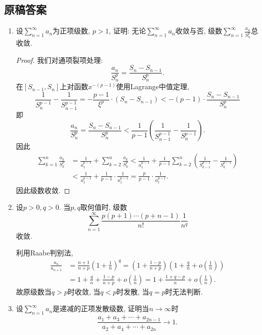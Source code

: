 \documentclass[UTF8,11pt, a4paper, oneside, fontset=none]{ctexbook}
\begin{document}
\subsection*{原稿答案}

\begin{enumerate}


\item 设$\sum_{n=1}^{\infty} a_n$为正项级数, $p>1$, 证明: 无论$\sum_{n=1}^{\infty} a_n$收敛与否, 级数$\sum_{n=1}^{\infty} \frac{a_n}{S_n^p}$总收敛.


\begin{proof}

我们对通项裂项处理:
\[
\frac{a_n}{S_n^p} = \frac{S_n - S_{n-1}}{S_n^p}.
\]
在$[S_{n-1}, S_n]$上对函数$x^{-(p-1)}$使用Lagrange中值定理, 
\[
\frac{1}{S_{n}^{p-1}} - \frac{1}{S_{n-1}^{p-1}} = - \frac{p-1}{\xi^p} \cdot (S_n-S_{n-1}) <- ( p - 1) \cdot \frac{S_n-S_{n-1}}{S_n^p}
\]
即
\[
\frac{a_n}{S_n^p} = \frac{S_n - S_{n-1}}{S_n^p} < \frac{1}{p-1} \left( \frac{1}{S_{n-1}^{p-1}} - \frac{1}{S_n^{p-1}} \right).
\]
因此
\begin{align*}
\sum_{k=1}^{n} \frac{a_k}{S_k^p} &= \frac{1}{a_1^{p-1}} + \sum_{k=2}^{n} \frac{a_k}{S_k^p} < \frac{1}{a_1^{p-1}} + \frac{1}{p-1} \sum_{k=2}^{n} \left( \frac{1}{S_{k-1}^{p-1}} - \frac{1}{S_k^{p-1}} \right)\\
&< \frac{1}{a_1^{p-1}} + \frac{1}{p-1} \cdot \frac{1}{a_1^{p-1}} = \frac{p}{p-1} \cdot \frac{1}{a_1^{p-1}}.
\end{align*}
因此级数收敛.

\end{proof}


\item 设$p>0, q>0$. 当$p, q$取何值时, 级数
\[
\sum_{n=1}^{\infty} \frac{p(p+1)\cdots (p+n-1)}{n!} \frac{1}{n^q}
\]
收敛. 

利用Raabe判别法,
\begin{align*}
\frac{a_n}{a_{n+1}} &= \frac{n+1}{n+p} \left( 1 + \frac{1}{n}  \right)^q =  \left( 1 + \frac{1-p}{n+p}  \right)  \left( 1 + \frac{q}{n} + o \left( \frac{1}{n} \right) \right)\\
&= 1 + \frac{q}{n} + \frac{1-p}{n+p} + o \left( \frac{1}{n} \right)= 1 + \frac{1+q-p}{n} + o \left( \frac{1}{n} \right).
\end{align*}
故原级数当$q > p$时收敛, 当$q < p$时发散, 当$q =p$时无法判断.

\item 设$\sum_{n=1}^{\infty} a_n$是递减的正项发散级数, 证明当$n \to \infty$时
\[
\frac{a_1 + a_3 + \cdots + a_{2n-1}}{a_2 + a_4 + \cdots + a_{2n}} \to 1.
\]


\end{enumerate}
\end{document}
